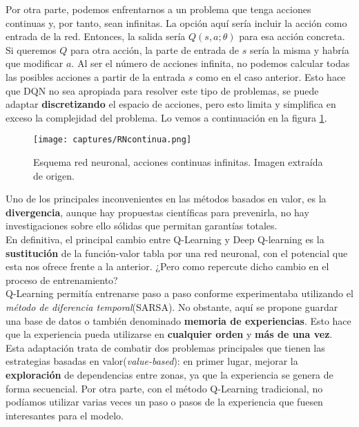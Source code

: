 \documentclass[11pt,fleqn]{book} %
\begin{document}
Por otra parte, podemos enfrentarnos a un problema que tenga acciones continuas y, por tanto, sean infinitas. La opción aquí sería incluir la acción como entrada de la red. Entonces, la salida sería $Q(s,a;\theta)$ para esa acción concreta. Si queremos $Q$ para otra acción, la parte de entrada de $s$ sería la misma y habría que modificar $a$. Al ser el número de acciones infinita, no podemos calcular todas las posibles acciones a partir de la entrada $s$ como en el caso anterior. Esto hace que DQN no sea apropiada para resolver este tipo de problemas, se puede adaptar \textbf{discretizando} el espacio de acciones, pero esto limita y simplifica en exceso la complejidad del problema. Lo vemos a continuación en la figura \ref{fig:RNcontinua}.

\begin{figure}[H]
	\centering\texttt{[image: captures/RNcontinua.png]}
	\caption{Esquema red neuronal, acciones continuas infinitas. Imagen extraída de origen. \cite{article:RLromero}}
	\label{fig:RNcontinua} %
\end{figure}

Uno de los principales inconvenientes en las métodos basados en valor, es la \textbf{divergencia}, aunque hay propuestas científicas para prevenirla, no hay investigaciones sobre ello sólidas que permitan garantías totales. \\

En definitiva, el principal cambio entre Q-Learning y Deep Q-learning es la \textbf{sustitución} de la función-valor tabla por una red neuronal, con el potencial que esta nos ofrece frente a la anterior. ¿Pero como repercute dicho cambio en el proceso de entrenamiento? \\

Q-Learning permitía entrenarse paso a paso conforme experimentaba utilizando el \textit{método de diferencia temporal}(SARSA). No obstante, aquí se propone guardar una base de datos o también denominado \textbf{memoria de experiencias}. Esto hace que la experiencia pueda utilizarse en \textbf{cualquier orden} y \textbf{más de una vez}.\\

Esta adaptación trata de combatir dos problemas principales que tienen las estrategias basadas en valor(\textit{value-based}): en primer lugar, mejorar la \textbf{exploración} de dependencias entre zonas, ya que la experiencia se genera de forma secuencial. Por otra parte, con el método Q-Learning tradicional, no podíamos utilizar varias veces un paso o pasos de la experiencia que fuesen interesantes para el modelo. \\
\end{document}
